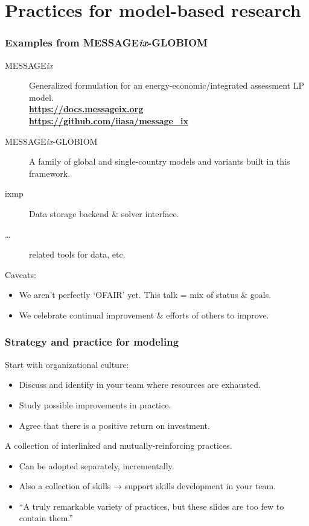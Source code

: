 \documentclass[12pt,aspectratio=169]{beamer}
\begin{document}
\section{Practices for model-based research}
\begin{frame}
\frametitle{Examples from MESSAGE\emph{ix}-GLOBIOM}

\begin{description}
  \item [MESSAGE\emph{ix}] Generalized formulation for an energy-economic/integrated assessment LP model. \\
  {\bfseries \url{https://docs.messageix.org} \\ \url{https://github.com/iiasa/message_ix}}
  \item [MESSAGE\emph{ix}-GLOBIOM] A family of global and single-country models and variants built in this framework.
  \item [\ttfamily ixmp] Data storage backend \& solver interface.
  \item […] related tools for data, etc.
\end{description}

\bigskip
Caveats:
\begin{itemize}
  \item We aren't perfectly ‘OFAIR’ yet. This talk = mix of status \& goals.
  \item We celebrate continual improvement \& efforts of others to improve.
\end{itemize}

\end{frame}

\begin{frame}
\frametitle{Strategy and practice for modeling}

Start with organizational culture:
\begin{itemize}
  \item Discuss and identify in your team where resources are exhausted.
  \item Study possible improvements in practice.
  \item Agree that there is a positive return on investment.
\end{itemize}

\bigskip
A collection of interlinked and mutually-reinforcing practices.
\begin{itemize}
  \item Can be adopted separately, incrementally.
  \item Also a collection of skills → support skills development in your team.
  \item “A truly remarkable variety of practices, but these slides are too few to contain them.”
\end{itemize}

\end{frame}
\end{document}
